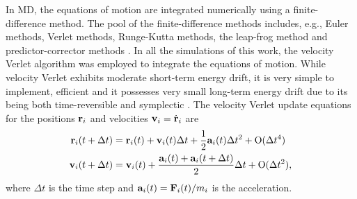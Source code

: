 
In MD, the equations of motion are integrated numerically using a finite-difference method. The pool of the finite-difference methods includes, e.g., Euler methods, Verlet methods, Runge-Kutta methods, the leap-frog method and predictor-corrector methods \cite{allentildesley}. In all the simulations of this work, the velocity Verlet algorithm was employed to integrate the equations of motion. While velocity Verlet exhibits moderate short-term energy drift, it is very simple to implement, efficient and it possesses very small long-term energy drift due to its being both time-reversible and symplectic \cite{frenkelsmit}. The velocity Verlet update equations for the positions $\mathbf{r}_i$ and velocities $\mathbf{v}_i=\dot{\mathbf{r}}_i$ are \cite{allentildesley}
\begin{alignat}{2}
  \mathbf{r}_i(t+\Delta t) &= \mathbf{r}_i(t) + \mathbf{v}_i(t)\Delta t+  \frac{1}{2}\mathbf{a}_i(t) \Delta t^2 + \mathrm{O}(\Delta t^4) \\
  \mathbf{v}_i(t+\Delta t) &= \mathbf{v}_i(t) + \frac{ \mathbf{a}_i(t)+\mathbf{a}_i(t+\Delta t)}{2} \Delta t+ \mathrm{O}(\Delta t^2) ,
\end{alignat}
where $\Delta t$ is the time step and $\mathbf{a}_i(t)=\mathbf{F}_i(t)/m_i$ is the acceleration.

